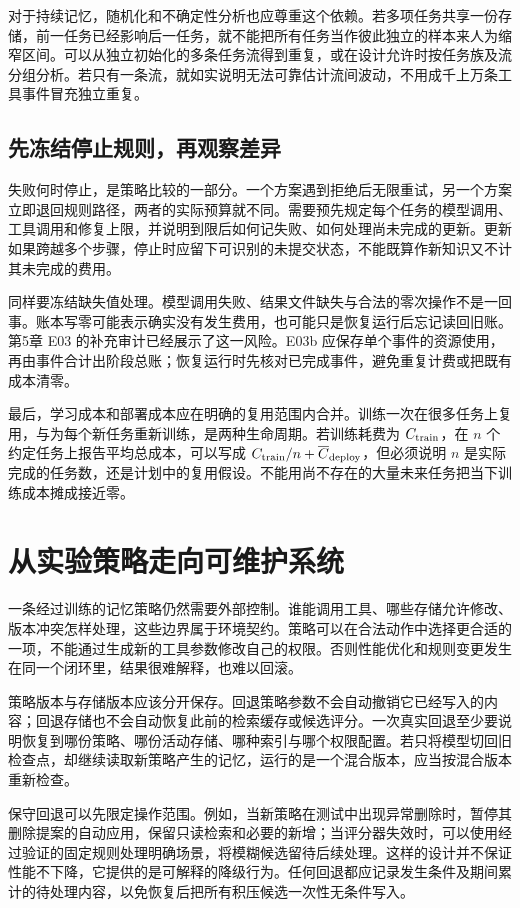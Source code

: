对于持续记忆，随机化和不确定性分析也应尊重这个依赖。若多项任务共享一份存储，前一任务已经影响后一任务，就不能把所有任务当作彼此独立的样本来人为缩窄区间。可以从独立初始化的多条任务流得到重复，或在设计允许时按任务族及流分组分析。若只有一条流，就如实说明无法可靠估计流间波动，不用成千上万条工具事件冒充独立重复。

\subsection{先冻结停止规则，再观察差异}

失败何时停止，是策略比较的一部分。一个方案遇到拒绝后无限重试，另一个方案立即退回规则路径，两者的实际预算就不同。需要预先规定每个任务的模型调用、工具调用和修复上限，并说明到限后如何记失败、如何处理尚未完成的更新。更新如果跨越多个步骤，停止时应留下可识别的未提交状态，不能既算作新知识又不计其未完成的费用。

同样要冻结缺失值处理。模型调用失败、结果文件缺失与合法的零次操作不是一回事。账本写零可能表示确实没有发生费用，也可能只是恢复运行后忘记读回旧账。第5章 E03 的补充审计已经展示了这一风险。E03b 应保存单个事件的资源使用，再由事件合计出阶段总账；恢复运行时先核对已完成事件，避免重复计费或把既有成本清零。

最后，学习成本和部署成本应在明确的复用范围内合并。训练一次在很多任务上复用，与为每个新任务重新训练，是两种生命周期。若训练耗费为 $C_{\rm train}$，在 $n$ 个约定任务上报告平均总成本，可以写成 $C_{\rm train}/n+\overline C_{\rm deploy}$，但必须说明 $n$ 是实际完成的任务数，还是计划中的复用假设。不能用尚不存在的大量未来任务把当下训练成本摊成接近零。

\section{从实验策略走向可维护系统}
\label{sec:ch06-maintainable}

一条经过训练的记忆策略仍然需要外部控制。谁能调用工具、哪些存储允许修改、版本冲突怎样处理，这些边界属于环境契约。策略可以在合法动作中选择更合适的一项，不能通过生成新的工具参数修改自己的权限。否则性能优化和规则变更发生在同一个闭环里，结果很难解释，也难以回滚。

策略版本与存储版本应该分开保存。回退策略参数不会自动撤销它已经写入的内容；回退存储也不会自动恢复此前的检索缓存或候选评分。一次真实回退至少要说明恢复到哪份策略、哪份活动存储、哪种索引与哪个权限配置。若只将模型切回旧检查点，却继续读取新策略产生的记忆，运行的是一个混合版本，应当按混合版本重新检查。

保守回退可以先限定操作范围。例如，当新策略在测试中出现异常删除时，暂停其删除提案的自动应用，保留只读检索和必要的新增；当评分器失效时，可以使用经过验证的固定规则处理明确场景，将模糊候选留待后续处理。这样的设计并不保证性能不下降，它提供的是可解释的降级行为。任何回退都应记录发生条件及期间累计的待处理内容，以免恢复后把所有积压候选一次性无条件写入。

